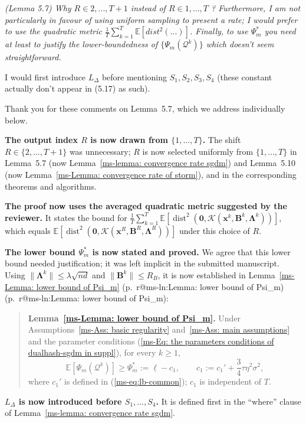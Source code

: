 \documentclass[11pt]{article}
\makeatletter
\newcommand{\mref}[1]{\ref*{ms-#1}}
\newcommand{\mpage}[1]{\pageref*{ms-#1}}
\newcommand{\meq}[1]{(\mref{#1})}
\newcommand{\mhasline}[1]{\ifcsname r@ms-ln:#1\endcsname\expandafter\@firstoftwo\else\expandafter\@secondoftwo\fi}
\newcommand{\mline}[1]{\getrefnumber{ms-ln:#1}}
\newcommand{\mpl}[1]{p.~\mpage{#1}\mhasline{#1}{, line~\mline{#1}}{}}
\newcommand{\EE}{\mathbb{E}}
\newcommand{\dist}{\operatorname{dist}}
\newcommand{\zero}{\bm{0}}
\newcommand{\calQ}{\mathcal{Q}}
\newcommand{\calK}{\mathcal{K}}
\newcommand{\bB}{\bm{B}}
\newcommand{\bLmbd}{\bm{\Lambda}}
\newcommand{\bx}{\bm{x}}
\newcommand{\blue}[1]{{\ifmmode\color{blue}#1\else\normalfont\upshape\color{blue}#1\fi}}
\newenvironment{bluequote}{\begin{quote}\normalfont\upshape\color{blue}}{\end{quote}}
\newcommand{\newred}[1]{{\color{red}#1}}
\let\reviewitem\item
\newenvironment{qalist}{\begin{description}[leftmargin=0pt,labelindent=0pt,itemsep=0.8em,parsep=0.5em,font=\normalfont\upshape\bfseries]}{\end{description}}
\makeatother
\begin{document}
\begin{qalist}
\item[{Q50.}] {\itshape (Lemma 5.7) Why $R\in 2,...,T+1$ instead of $R\in 1,...,T$ ? Furthermore, I am not particularly in favour of using uniform sampling to present a rate; I would prefer to use the quadratic metric $\frac{1}{T}\sum_{k=1}^{T}\EE[dist^2(...)]$. Finally, to use $\Psi_m^*$ you need at least to justify the lower-boundedness of $\{\Psi_m(\calQ^k)\}$ which doesn't seem straightforward.
\par I would first introduce $L_\Delta$ before mentioning $S_1,S_2,S_3,S_4$ (these constant actually don't appear in (5.17) as such).}
\item[Response:] \newred{Thank you for these comments on Lemma~5.7, which we address} individually below.
\begin{enumerate}[label={[\roman*]},before=\let\item\reviewitem]
\item \textbf{The output index $R$ is now drawn from $\{1,\ldots,T\}$.} The shift $R\in\{2,\ldots,T+1\}$ was unnecessary; $R$ is now selected uniformly from $\{1,\ldots,T\}$ in Lemma~5.7 (now Lemma~\mref{lemma: convergence rate sgdm}) and Lemma~5.10 (now Lemma~\mref{Lemma: convergence rate of storm}), and in the corresponding theorems and algorithms.
\item \textbf{The proof now uses the averaged quadratic metric suggested by the reviewer.} It states the bound for $\frac{1}{T}\sum_{k=1}^{T}\EE[\dist^2(\zero,\calK(\bx^k,\bB^k,\bLmbd^k))]$, which equals $\EE[\dist^2(\zero,\calK(\bx^R,\bB^R,\bLmbd^R))]$ under this choice of $R$.
\item\textbf{The lower bound $\Psi_m^*$ is now stated and proved.} We agree that this lower bound needed justification; it was left implicit in the submitted manuscript. Using $\|\bLmbd^k\|\le\lambda\sqrt{nd}$ and $\|\bB^k\|\le R_B$, it is now established in Lemma~\mref{Lemma: lower bound of Psi_m} \blue{(\mpl{Lemma: lower bound of Psi_m})}:
\begin{bluequote}
\textbf{Lemma~\mref{Lemma: lower bound of Psi_m}.} Under Assumptions~\mref{Ass: basic regularity} and~\mref{Ass: main assumptions} and the parameter conditions \meq{Eq: the parameters conditions of dualhash-sgdm in suppl}, for every $k\ge1$,
\[
\EE[\Psi_m(\calQ^k)]\ge\Psi_m^*:=\underline{\ell}-c_1,
\qquad
c_1:=c_1'+\frac34\tau\eta^2\sigma^2,
\]
where $c_1'$ is defined in \meq{eq:lb-common}; $c_1$ is independent of $T$.
\end{bluequote}
\item \textbf{$L_\Delta$ is now introduced before $S_1,\ldots,S_4$.} It is defined first in the ``where'' clause of Lemma~\mref{lemma: convergence rate sgdm}.
\end{enumerate}


\end{qalist}
\end{document}
